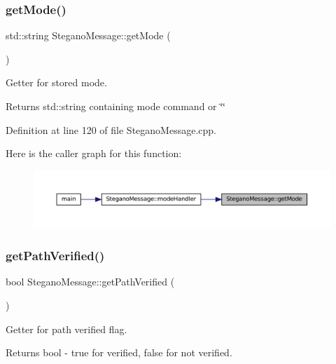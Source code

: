 \subsubsection{\texorpdfstring{getMode()}{getMode()}}
{\footnotesize\ttfamily std\+::string Stegano\+Message\+::get\+Mode (\begin{DoxyParamCaption}{ }\end{DoxyParamCaption})}



Getter for stored mode. 

\begin{DoxyReturn}{Returns}
std\+::string containing mode command or \char`\"{}\char`\"{} 
\end{DoxyReturn}


Definition at line 120 of file Stegano\+Message.\+cpp.

Here is the caller graph for this function\+:\nopagebreak
\begin{figure}[H]
\begin{center}
\leavevmode
\includegraphics[width=350pt]{classSteganoMessage_a7dc660e6d2c8f162636f789cfedde67e_icgraph}
\end{center}
\end{figure}
\mbox{\label{classSteganoMessage_ace172144e49a4da69b890958b3b8089b}} 
\subsubsection{\texorpdfstring{getPathVerified()}{getPathVerified()}}
{\footnotesize\ttfamily bool Stegano\+Message\+::get\+Path\+Verified (\begin{DoxyParamCaption}{ }\end{DoxyParamCaption})}



Getter for path verified flag. 

\begin{DoxyReturn}{Returns}
bool -\/ true for verified, false for not verified. 
\end{DoxyReturn}



